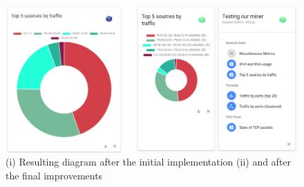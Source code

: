 \begin{figure}[]
    \centering
    \includegraphics[width=16cm]{images/case-study-researcher-diagrams.png}
    \caption{(i) Resulting diagram after the initial implementation (ii) and after the final improvements}
    \label{fig:firstimplementation}
\end{figure}

